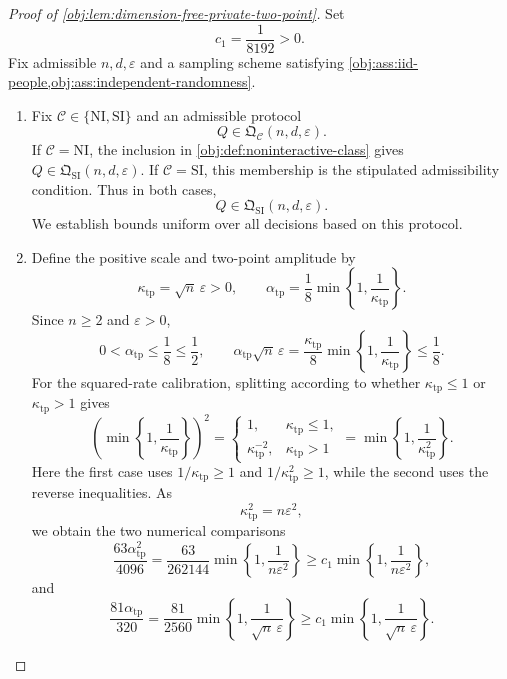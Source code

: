 \begin{proof}[Proof of \cref{obj:lem:dimension-free-private-two-point}]
Set
\[
c_1=\frac{1}{8192}>0.
\]
Fix admissible \(n,d,\varepsilon\) and a sampling scheme satisfying
\cref{obj:ass:iid-people,obj:ass:independent-randomness}.

\begin{enumerate}
\item Fix \(\mathcal C\in\{\mathrm{NI},\mathrm{SI}\}\) and an admissible protocol
\[
Q\in\mathfrak Q_{\mathcal C}(n,d,\varepsilon).
\]
If \(\mathcal C=\mathrm{NI}\), the inclusion in
\cref{obj:def:noninteractive-class} gives
\(Q\in\mathfrak Q_{\mathrm{SI}}(n,d,\varepsilon)\).
If \(\mathcal C=\mathrm{SI}\), this membership is the stipulated admissibility condition. Thus in both cases,
\[
Q\in\mathfrak Q_{\mathrm{SI}}(n,d,\varepsilon).
\]
We establish bounds uniform over all decisions based on this protocol.

\item Define the positive scale and two-point amplitude by
\[
\kappa_{\mathrm{tp}}=\sqrt n\,\varepsilon>0,
\qquad
\alpha_{\mathrm{tp}}
=\frac18\min\left\{1,\frac1{\kappa_{\mathrm{tp}}}\right\}.
\]
Since \(n\ge2\) and \(\varepsilon>0\),
\[
0<\alpha_{\mathrm{tp}}\le\frac18\le\frac12,
\qquad
\alpha_{\mathrm{tp}}\sqrt n\,\varepsilon
=\frac{\kappa_{\mathrm{tp}}}{8}
  \min\left\{1,\frac1{\kappa_{\mathrm{tp}}}\right\}
\le\frac18.
\]
For the squared-rate calibration, splitting according to whether
\(\kappa_{\mathrm{tp}}\le1\) or \(\kappa_{\mathrm{tp}}>1\) gives
\[
\left(\min\left\{1,\frac1{\kappa_{\mathrm{tp}}}\right\}\right)^2
=
\begin{cases}
1,&\kappa_{\mathrm{tp}}\le1,\\
\kappa_{\mathrm{tp}}^{-2},&\kappa_{\mathrm{tp}}>1
\end{cases}
=
\min\left\{1,\frac1{\kappa_{\mathrm{tp}}^2}\right\}.
\]
Here the first case uses
\(1/\kappa_{\mathrm{tp}}\ge1\) and
\(1/\kappa_{\mathrm{tp}}^2\ge1\), while the second uses the reverse inequalities.
As
\[
\kappa_{\mathrm{tp}}^2=n\varepsilon^2,
\]
we obtain the two numerical comparisons
\[
\frac{63\alpha_{\mathrm{tp}}^2}{4096}
=
\frac{63}{262144}\min\left\{1,\frac1{n\varepsilon^2}\right\}
\ge
c_1\min\left\{1,\frac1{n\varepsilon^2}\right\},
\]
and
\[
\frac{81\alpha_{\mathrm{tp}}}{320}
=
\frac{81}{2560}\min\left\{1,\frac1{\sqrt n\,\varepsilon}\right\}
\ge
c_1\min\left\{1,\frac1{\sqrt n\,\varepsilon}\right\}.
\]


\end{enumerate}
\end{proof}
